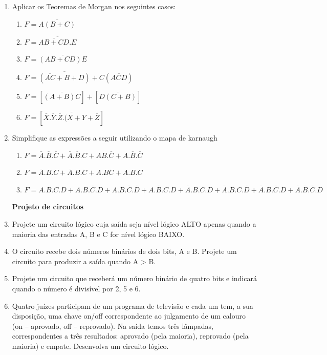 \documentclass[12pt,onepage,a4paper]{memoir}
\begin{document}
\begin{enumerate}
    \item Aplicar os Teoremas de Morgan nos seguintes casos:
    \begin{enumerate}
        \item $F = \overline{A(B+C)}$
        \item $F = \overline{\overline{AB+CD}.E}$
        \item $F = \overline{(AB+CD)E}$
        \item $F = \overline{(\overline{AC}+ B+D)} + C(\overline{ACD})$
        \item $F = [\overline{(A+B)C}]+[\overline{D(C+B)}]$
        \item $F = [\overline{\overline{X}.\overline{Y}.\overline{Z}.(X+Y+\overline{Z}}]$
    \end{enumerate}

    \item Simplifique as expressões a seguir utilizando o mapa de karnaugh
    \begin{enumerate}
        \item $F=\overline{A}.\overline{B}.\overline{C} + \overline{A}.\overline{B}.C+AB.\overline{C}+A.\overline{B}.\overline{C}$
        \item $F = \overline{A}.\overline{B}.C+\overline{A}.B.\overline{C}+A.B\overline{C}+A.B.C$
        \item $F = A.B.C.D+A.B.\overline{C}.D+A.B.\overline{C}.\overline{D}+A.\overline{B}.C.D+\overline{A}.B.C.D+\overline{A}.B.C.\overline{D}+\overline{A}.B.\overline{C}.D+\overline{A}.\overline{B}.\overline{C}.D$
    \end{enumerate}

\begin{center}
    \textbf{Projeto de circuitos}
\end{center}

    \item Projete um circuito lógico cuja saída seja nível lógico ALTO apenas quando a maioria das entradas A, B e C for nível lógico BAIXO.

    \item O circuito recebe dois números binários de dois bits, A e B. Projete um circuito para produzir a saída quando A > B.

    \item Projete um circuito que receberá um número binário de quatro bits e indicará quando o número é divisível por 2, 5 e 6.

    \item Quatro juízes participam de um programa de televisão e cada um tem, a sua disposição, uma chave on/off correspondente ao julgamento de um calouro (on – aprovado, off – reprovado). Na saída temos três lâmpadas, correspondentes a três resultados: aprovado (pela maioria), reprovado (pela maioria) e empate. Desenvolva um circuito lógico.


\end{enumerate}
\end{document}
